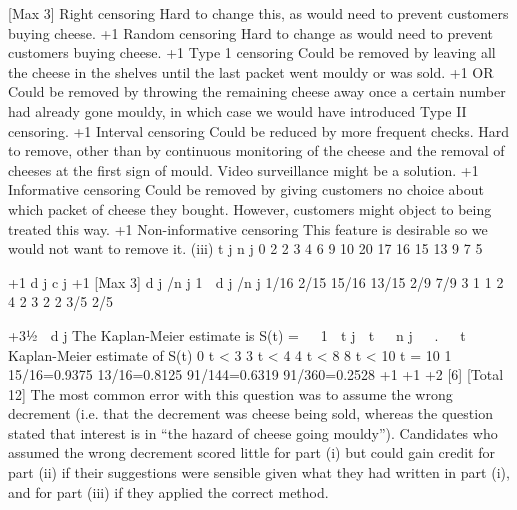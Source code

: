 \documentclass[a4paper,12pt]{article}
\begin{document}
[Max 3]
Right censoring
Hard to change this, as would need to prevent customers buying cheese.
+1
Random censoring
Hard to change as would need to prevent customers buying cheese.
+1
Type 1 censoring
Could be removed by leaving all the cheese in the shelves until the
last packet went mouldy or was sold.
+1
OR
Could be removed by throwing the remaining cheese away once a certain
number had already gone mouldy, in which case we would have
introduced Type II censoring.
+1
Interval censoring
Could be reduced by more frequent checks. Hard to remove,
other than by continuous monitoring of the cheese and the
removal of cheeses at the first sign of mould. Video surveillance
might be a solution.
+1
Informative censoring
Could be removed by giving customers no choice about which
packet of cheese they bought. However, customers
might object to being treated this way.
+1
Non-informative censoring
This feature is desirable so we would not want to remove it.
(iii)
t j n j
0
2
2
3
4
6
9
10 20
17
16
15
13
9
7
5

+1
d j
c j
+1
[Max 3]
d j /n j 1  d j /n j
1/16
2/15 15/16
13/15
2/9 7/9
3
1
1
2
4
2
3 2
2 3/5 2/5
   
+31⁄2
 d j
The Kaplan-Meier estimate is S(t) =   1 
t j  t 
 n j

 . 


t Kaplan-Meier estimate of S(t)
0 \leq t < 3
3 \leq t < 4
4 \leq t < 8
8 \leq t < 10
t = 10 1
15/16=0.9375
13/16=0.8125
91/144=0.6319
91/360=0.2528
+1 +1
+2
[6]
[Total 12]
The most common error with this question was to assume the wrong
decrement (i.e. that the decrement was cheese being sold, whereas the
question stated that interest is in “the hazard of cheese going mouldy”).
Candidates who assumed the wrong decrement scored little for part (i) but
could gain credit for part (ii) if their suggestions were sensible given what they
had written in part (i), and for part (iii) if they applied the correct method.
\end{document}
